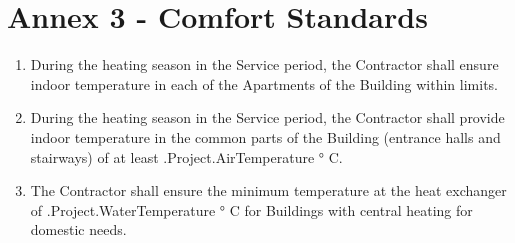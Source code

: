 \section{Annex 3 {-} Comfort Standards}

\begin{enumerate}[label=\arabic*.]
\item During the heating season in the Service period, the Contractor
  shall ensure indoor temperature in each of the Apartments of the
  Building within limits.

\item During the heating season in the Service period, the Contractor
  shall provide indoor temperature in the common parts of the Building
  (entrance halls and stairways) of at least {{.Project.AirTemperature}} ° C.

\item The Contractor shall ensure the minimum temperature at the heat
  exchanger of {{.Project.WaterTemperature}} ° C for Buildings with central heating for
  domestic needs.

\end{enumerate}
